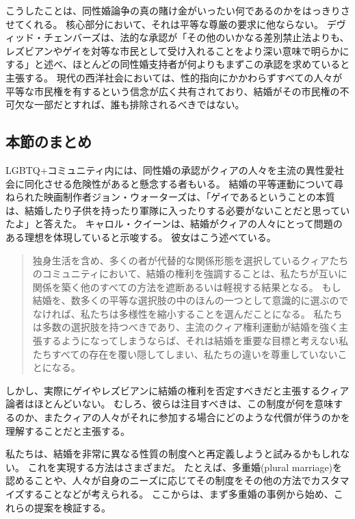 \documentclass[paper=a4,book,openany]{jlreq} \usepackage{mystyle}
\begin{document}
こうしたことは、同性婚論争の真の賭け金がいったい何であるのかをはっきりさせてくれる。
核心部分において、それは平等な尊厳の要求に他ならない。
デヴィッド・チェンバーズは、法的な承認が「その他のいかなる差別禁止法よりも、レズビアンやゲイを対等な市民として受け入れることをより深い意味で明らかにする」と述べ、ほとんどの同性婚支持者が何よりもまずこの承認を求めていると主張する\citep[p.450]{chambers96:_what_if}。
現代の西洋社会においては、性的指向にかかわらずすべての人々が平等な市民権を有するという信念が広く共有されており、結婚がその市民権の不可欠な一部だとすれば、誰も排除されるべきではない。

\subsection{本節のまとめ}

LGBTQ+コミュニティ内には、同性婚の承認がクィアの人々を主流の異性愛社会に同化させる危険性があると懸念する者もいる。
結婚の平等運動について尋ねられた映画制作者ジョン・ウォーターズは、「ゲイであるということの本質は、結婚したり子供を持ったり軍隊に入ったりする必要がないことだと思っていたよ」と答えた\citep{haag13:_unqueer_world}。
キャロル・クイーンは、結婚がクィアの人々にとって問題のある理想を体現していると示唆する。
彼女はこう述べている。

\begin{quote}
独身生活を含め、多くの者が代替的な関係形態を選択しているクィアたちのコミュニティにおいて、結婚の権利を強調することは、私たちが互いに関係を築く他のすべての方法を遮断あるいは軽視する結果となる。
もし結婚を、数多くの平等な選択肢の中のほんの一つとして意識的に選ぶのでなければ、私たちは多様性を縮小することを選んだことになる。
私たちは多数の選択肢を持つべきであり、主流のクィア権利運動が結婚を強く主張するようになってしまうならば、それは結婚を重要な目標と考えない私たちすべての存在を覆い隠してしまい、私たちの違いを尊重していないことになる。
\citep[p.111]{queen04:_never_brides_never_bride}

\end{quote}

しかし、実際にゲイやレズビアンに結婚の権利を否定すべきだと主張するクィア論者はほとんどいない。
むしろ、彼らは注目すべきは、この制度が何を意味するのか、またクィアの人々がそれに参加する場合にどのような代償が伴うのかを理解することだと主張する。

私たちは、結婚を非常に異なる性質の制度へと再定義しようと試みるかもしれない。
これを実現する方法はさまざまだ。
たとえば、多重婚(plural marriage)を認めることや、人々が自身のニーズに応じてその制度をその他の方法でカスタマイズすることなどが考えられる。
ここからは、まず多重婚の事例から始め、これらの提案を検証する。
\end{document}
